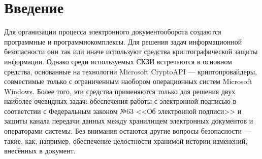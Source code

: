 \section{Введение} \label{research_introduction}



\vspace{\baselineskip}
Для организации процесса электронного документооборота создаются программные и программно комплексы. Для решения задач информационной безопасности они так или иначе используют средства криптографической защиты информации. Однако среди используемых СКЗИ встречаются в основном средства, основанные на технологии Microsoft CryptoAPI --- криптопровайдеры, совместимые только с ограниченным наобором операционных систем Microsoft Windows. Более того, эти средства применяются только для решения двух наиболее очевидных задач: обеспечения работы с электронной подписью в соответстии с Федеральным законом №63 <<Об электронной подписи>> и защиты канала передачи данных между хранилищем электронных документов и операторами системы. Без внимания остаются другие вопросы безопасности --- такие, как, например, обеспечение целостности хранимой истории изменений, внесённых в документ.

